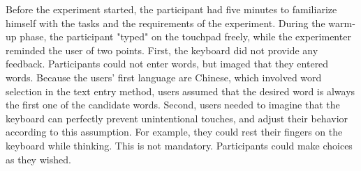 
Before the experiment started, the participant had five minutes to familiarize himself with the tasks and the requirements of the experiment. During the warm-up phase, the participant "typed" on the touchpad freely, while the experimenter reminded the user of two points. First, the keyboard did not provide any feedback. Participants could not enter words, but imaged that they entered words. Because the users' first language are Chinese, which involved word selection in the text entry method, users assumed that the desired word is always the first one of the candidate words. Second, users needed to imagine that the keyboard can perfectly prevent unintentional touches, and adjust their behavior according to this assumption. For example, they could rest their fingers on the keyboard while thinking. This is not mandatory. Participants could make choices as they wished.

